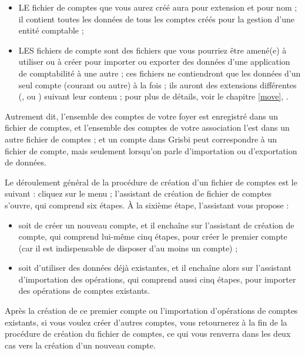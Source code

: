 \begin{itemize}
	\item LE \og fichier de comptes \fg{} que vous aurez créé aura pour extension  et pour nom  ; il contient toutes les données de tous les comptes créés pour la gestion d'une entité comptable ;
	\item LES \og fichiers de compte \fg{} sont des fichiers que vous pourriez être amené(e) à utiliser ou à créer pour importer ou exporter des données d'une application de comptabilité à une autre ; ces fichiers ne contiendront que les données d'un seul compte (courant ou autre) à la fois ; ils auront des extensions différentes (,  ou ) suivant leur contenu ; pour plus de détails, voir le chapitre \vref{move}, .
\end{itemize}

Autrement dit, l'ensemble des comptes de votre foyer est enregistré dans un fichier de comptes, et l'ensemble des comptes de votre association l'est dans un autre fichier de comptes ; et un compte dans Grisbi peut correspondre à un fichier de compte, mais seulement lorsqu'on parle d'importation ou d'exportation de données.

Le déroulement général de la procédure de création d'un fichier de comptes est le suivant : cliquez sur le menu  ; l'assistant de création de fichier de comptes s'ouvre, qui comprend six étapes. À la sixième étape, l'assistant vous propose :

\begin{itemize}
	\item  soit de créer un nouveau compte, et il enchaîne sur l'assistant de création de compte, qui comprend lui-même cinq étapes, pour créer le premier compte (car il est indispensable de disposer d'au moins un compte) ;
	\item soit d'utiliser des données déjà existantes, et il enchaîne alors sur l'assistant d'importation des opérations, qui comprend aussi cinq étapes, pour importer des opérations de comptes existants.
\end{itemize}

Après la création de ce premier compte ou l'importation d'opérations de comptes existants, si vous voulez créer d'autres comptes, vous retournerez à la fin de la procédure de création du fichier de comptes, ce qui vous renverra dans les deux cas vers la création d'un nouveau compte.


